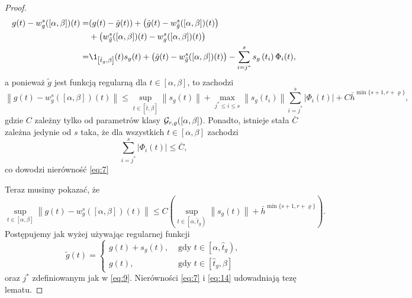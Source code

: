 \documentclass[oik, pdftex, man]{mgrwms}
\begin{document}
\begin{proof}
\begin{equation*}
            \begin{aligned}
                g(t)-w_{g}^{s}([\alpha, \beta])(t)=&(g(t)-\tilde{g}(t))+\left(\tilde{g}(t)-w_{\tilde{g}}^{s}([\alpha, \beta])(t)\right) \\
                &+\left(w_{\tilde{g}}^{s}([\alpha, \beta])(t)-w_{g}^{s}([\alpha, \beta])(t)\right) \\
                =& \1_{\left[\hat{t}_{g}, \beta\right]}(t) s_{g}(t)+\left(\tilde{g}(t)-w_{\tilde{g}}^{s}([\alpha, \beta])(t)\right)-\sum_{i=j^{*}}^{s} s_{g}\left(t_{i}\right) \Phi_{i}(t),
            \end{aligned}
        \end{equation*}
        a ponieważ $\tilde{g}$ jest funkcją regularną dla $t \in[\alpha, \beta]$, to zachodzi
        \begin{equation*}
            \left\|g(t)-w_{g}^{s}([\alpha, \beta])(t)\right\| \leq 
                \sup _{t \in[\hat{t}, \beta]}\left\|s_{g}(t)\right\|+\max _{j^{*} \leq i \leq s}\left\|s_{g}\left(t_{i}\right)\right\| \sum_{i=j^{*}}^{s}\left|\Phi_{i}(t)\right|+C \bar{h}^{\min \{s+1, r+\varrho\}},
        \end{equation*}
        gdzie $C$ zależny tylko od parametrów klasy $\mathcal{G}_{r,\varrho}([\alpha,\beta])$. Ponadto, istnieje stała $\bar{C}$ zależna jedynie od $s$ taka, że dla wszystkich $t \in[\alpha, \beta]$ zachodzi
        \begin{equation} \label{eq:13}
            \sum_{i=j^{*}}^{s}\left|\Phi_{i}(t)\right| \leq \bar{C},
        \end{equation}
        co dowodzi nierówność \eqref{eq:7}

        Teraz musimy pokazać, że
        \begin{equation} \label{eq:14}
            \sup _{t \in[\alpha, \beta]}\left\|g(t)-w_{g}^{s}([\alpha, \beta])(t)\right\| \leq C\left(\sup _{t \in\left[\alpha, \hat{t}_{g}\right)}\left\|s_{g}(t)\right\|+\bar{h}^{\min \{s+1, r+\varrho\}}\right).
        \end{equation}
        Postępujemy jak wyżej używając regularnej funkcji
        \begin{equation} \label{eq:15:tilde_g_z_plusem}
            \tilde{g}(t)= \begin{cases}
                g(t)+s_{g}(t),    & \text { gdy } t \in\left[\alpha, \hat{t}_{g}\right), \\ 
                g(t),             & \text { gdy } t \in\left[\hat{t}_{g}, \beta\right]
            \end{cases}
        \end{equation}
        oraz $j^{*}$ zdefiniowanym jak w \eqref{eq:9}.
        Nierówności \eqref{eq:7} i \eqref{eq:14} udowadniają tezę lematu.
    \end{proof}
\end{document}
